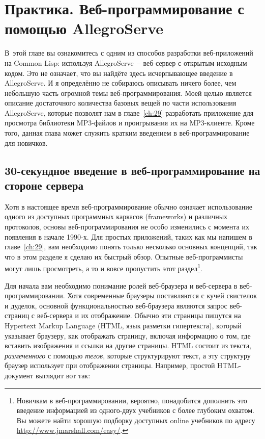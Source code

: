 \chapter{Практика. Веб-программирование с помощью AllegroServe}
\label{ch:26}

\thispagestyle{empty}

В~этой главе вы ознакомитесь с одним из способов разработки веб-приложений на Common Lisp:
используя AllegroServe~-- веб-сервер с открытым исходным кодом. Это не означает, что вы
найдёте здесь исчерпывающее введение в AllegroServe. И я определённо не собираюсь
описывать ничего более, чем небольшую часть огромной темы веб-программирования. Моей целью
является описание достаточного количества базовых вещей по части использования
AllegroServe, которые позволят нам в главе~\ref{ch:29} разработать приложение для
просмотра библиотеки MP3-файлов и проигрывания их на MP3-клиенте. Кроме того, данная глава
может служить кратким введением в веб-программирование для новичков.

\section{30-секундное введение в веб-программирование на стороне сервера}

Хотя в настоящее время веб-программирование обычно означает использование одного из
доступных программных каркасов (frameworks) и различных протоколов, основы
веб-программирования не особо изменились с момента их появления в начале 1990-х. Для
простых приложений, таких как мы напишем в главе~\ref{ch:29}, вам необходимо понять только
несколько основных концепций, так что в этом разделе я сделаю их быстрый обзор. Опытные
веб-программисты могут лишь просмотреть, а то и вовсе пропустить этот
раздел\footnote{Новичкам в веб-программировании, вероятно, понадобится дополнить это
  введение информацией из одного-двух учебников с более глубоким охватом. Вы можете найти
  хорошую подборку доступных online учебников по адресу
  \url{http://www.jmarshall.com/easy/}.}.

Для начала вам необходимо понимание ролей веб-браузера и веб-сервера в
веб-программировании. Хотя современные браузеры поставляются с кучей свистелок и дуделок,
основной функциональностью веб-браузера являются запрос веб-страниц с веб-сервера и их
отображение. Обычно эти страницы пишутся на Hypertext Markup Language (HTML, язык разметки
гипертекста), который указывает браузеру, как отображать страницу, включая информацию о
том, где вставить изображения и ссылки на другие страницы. HTML состоит из текста,
\textit{размеченного} с помощью \textit{тегов}, которые структурируют текст, а эту
структуру браузер использует при отображении страницы. Например, простой HTML-документ
выглядит вот так:

